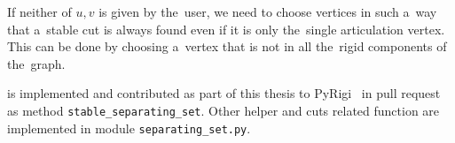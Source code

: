 If neither of \( u, v \) is given by the~user,
we need to choose vertices in such a~way
that a~stable cut is always found even if it is only the~single articulation vertex.
This can be done by choosing a~vertex that is not in all the~rigid components of the~graph.

%
is implemented and contributed as part of this thesis
to PyRigi~\cite{pyrigi} in pull request~\cite{pyrigi_pr_stable_cuts}
as method \texttt{stable\_separating\_set}.
Other helper and cuts related function
are implemented in module \texttt{separating\_set.py}.

